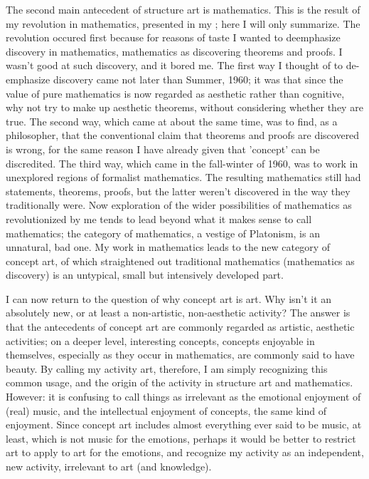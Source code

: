The second main antecedent of structure art is mathematics. This is the 
result of my revolution in mathematics, presented in my ; here I will only summarize. The revolution occured first because for 
reasons of taste I wanted to deemphasize discovery in mathematics, 
mathematics as discovering theorems and proofs. I wasn't good at such 
discovery, and it bored me. The first way I thought of to de-emphasize 
discovery came not later than Summer, 1960; it was that since the value of 
pure mathematics is now regarded as aesthetic rather than cognitive, why not 
try to make up aesthetic theorems, without considering whether they are 
true. The second way, which came at about the same time, was to find, as a 
philosopher, that the conventional claim that theorems and proofs are 
discovered is wrong, for the same reason I have already given that 'concept' 
can be discredited. The third way, which came in the fall-winter of 1960, 
was to work in unexplored regions of formalist mathematics. The resulting 
mathematics still had statements, theorems, proofs, but the latter weren't 
discovered in the way they traditionally were. Now exploration of the wider 
possibilities of mathematics as revolutionized by me tends to lead beyond 
what it makes sense to call mathematics; the category of mathematics, a 
vestige of Platonism, is an unnatural, bad one. My work in mathematics leads 
to the new category of concept art, of which straightened out traditional 
mathematics (mathematics as discovery) is an untypical, small but 
intensively developed part. 

I can now return to the question of why concept art is art. Why isn't it an 
absolutely new, or at least a non-artistic, non-aesthetic activity? The answer 
is that the antecedents of concept art are commonly regarded as artistic, 
aesthetic activities; on a deeper level, interesting concepts, concepts 
enjoyable in themselves, especially as they occur in mathematics, are 
commonly said to have beauty. By calling my activity art, therefore, I am 
simply recognizing this common usage, and the origin of the activity in 
structure art and mathematics. However: it is confusing to call things as 
irrelevant as the emotional enjoyment of (real) music, and the intellectual 
enjoyment of concepts, the same kind of enjoyment. Since concept art 
includes almost everything ever said to be music, at least, which is not music 
for the emotions, perhaps it would be better to restrict art to apply to art for 
the emotions, and recognize my activity as an independent, new activity, 
irrelevant to art (and knowledge). 

